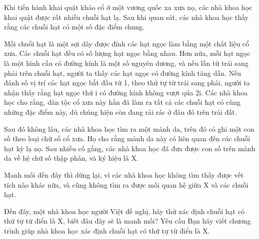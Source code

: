 Khi tiến hành khai quật khảo cổ ở một vương quốc xa xưa nọ, các nhà khoa học khai quật được rất nhiều chuỗi hạt lạ. Sau khi quan sát, các nhà khoa học thấy rằng các chuỗi hạt có một số đặc điểm chung.  

   Mỗi chuỗi hạt là một sợi dây được đính các hạt ngọc làm bằng một chất liệu cổ xưa. Các chuỗi hạt đều có số lượng hạt ngọc bằng nhau. Hơn nữa, mỗi hạt ngọc là một hình cầu có đường kính là một số nguyên dương, và nếu lần từ trái sang phải trên chuỗi hạt, người ta thấy các hạt ngọc có đường kính tăng dần. Nếu đánh số vị trí các hạt ngọc bắt đầu từ 1, theo thứ tự từ trái sang phải, người ta nhận thấy rằng hạt ngọc thứ i có đường kính không vượt qúa 2i. Các nhà khoa học cho rằng, dân tộc cổ xưa này hẳn đã làm ra tất cả các chuỗi hạt có cùng những đặc điểm này, dù chúng hiện còn đang rải rác ở đâu đó trên trái đất.  

   Sau đó không lâu, các nhà khoa học tìm ra một mảnh da, trên đó có ghi một con số theo loại chữ số cổ xưa. Họ cho rằng mảnh da này có liên quan đến các chuỗi hạt kỳ lạ nọ. Sau nhiều cố gắng, các nhà khoa học đã đưa được con số trên mảnh da về hệ chữ số thập phân, và ký hiệu là X.  

   Manh mối đến đây thì dừng lại, vì các nhà khoa học không tìm thấy được vết tích nào khác nữa, và cũng không tìm ra được mối quan hệ giữa X và các chuỗi hạt.  

   Đến đây, một nhà khoa học người Việt đề nghị, hãy thử xác định chuỗi hạt có thứ tự từ điển là X, biết đâu đây sẽ là manh mối?
   Yêu cầu  
Bạn hãy viết chương trình giúp nhà khoa học xác định chuỗi hạt có thứ tự từ điển là X.